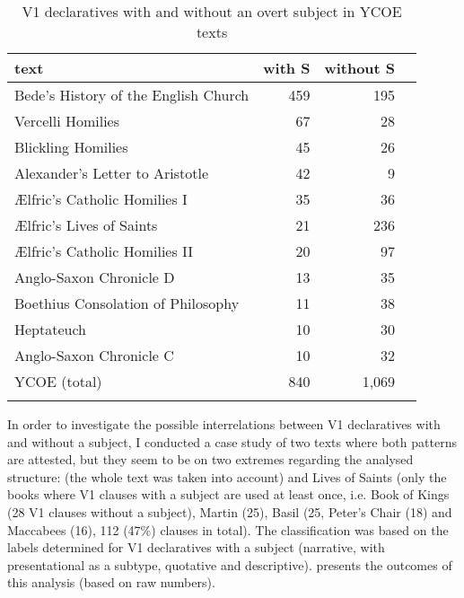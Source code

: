 \documentclass[output=paper,colorlinks,citecolor=brown]{langscibook}
\begin{document}
\begin{table}
\begin{tabularx}{0.8\textwidth}{Xrrr}
\lsptoprule
{text} & \multicolumn{1}{l}{with S} & \multicolumn{1}{l}{without S}\\
\midrule
{Bede's History of the English Church}  & {459} & {195}\\
{Vercelli Homilies} & {67} & {28}\\
{Blickling Homilies} & {45} & {26}\\
{Alexander's Letter to Aristotle} & {42} & {9}\\
{Ælfric's Catholic Homilies I}  & {35} & {36}\\
{Ælfric's Lives of Saints}  & {21} & {236}\\
{Ælfric's Catholic Homilies II}  & {20} & {97}\\
{Anglo-Saxon Chronicle D} & {13} & {35}\\
{Boethius Consolation of Philosophy}  & {11} & {38}\\
{Heptateuch} & {10} & {30}\\
{Anglo-Saxon Chronicle C} & {10} & {32}\\
\midrule
{YCOE (total)} & {840} & {1,069}\\
\lspbottomrule
\end{tabularx}
\caption{V1 declaratives with and without an overt subject in YCOE texts}
\label{tab:cichosz:5}
\end{table}

In order to investigate the possible interrelations between V1 declaratives with and without a subject, I conducted a case study of two texts where both patterns are attested, but they seem to be on two extremes regarding the analysed structure:  (the whole text was taken into account) and Lives of Saints (only the books where V1 clauses with a subject are used at least once, i.e. Book of Kings (28 V1 clauses without a subject), Martin (25), Basil (25, Peter's Chair (18) and Maccabees (16), 112 (47\%) clauses in total). The classification was based on the labels determined for V1 declaratives with a subject (narrative, with presentational as a subtype, quotative and descriptive).  presents the outcomes of this analysis (based on raw numbers).
\end{document}
